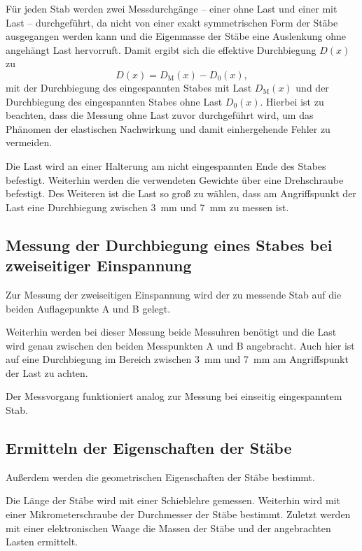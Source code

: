 Für jeden Stab werden zwei Messdurchgänge -- einer ohne Last und einer mit Last -- durchgeführt, 
da nicht von einer exakt symmetrischen Form der Stäbe ausgegangen werden kann und die Eigenmasse 
der Stäbe eine Auslenkung ohne angehängt Last hervorruft.
Damit ergibt sich die effektive Durchbiegung $D(x)$ zu
\begin{equation}
	D(x) = D_{\mathrm{M}}(x) - D_0(x) \mathrm{,}
\end{equation}
mit der Durchbiegung des eingespannten Stabes mit Last $D_{\mathrm{M}}(x)$ und der Durchbiegung
des eingespannten Stabes ohne Last $D_0(x)$.
Hierbei ist zu beachten, dass die Messung ohne Last zuvor durchgeführt wird, um das Phänomen 
der elastischen Nachwirkung \cite{V102} und damit einhergehende Fehler zu vermeiden.

Die Last wird an einer Halterung am nicht eingespannten Ende des Stabes befestigt. Weiterhin 
werden die verwendeten Gewichte über eine Drehschraube befestigt.
Des Weiteren ist die Last so groß zu wählen, dass am Angriffspunkt der Last eine Durchbiegung 
zwischen \SI{3}{\milli\meter} und \SI{7}{\milli\meter} zu messen ist.

\subsection{Messung der Durchbiegung eines Stabes bei zweiseitiger Einspannung}
Zur Messung der zweiseitigen Einspannung wird der zu messende Stab auf die beiden Auflagepunkte 
A und B gelegt.

Weiterhin werden bei dieser Messung beide Messuhren benötigt und die Last wird genau zwischen 
den beiden Messpunkten A und B angebracht. Auch hier ist auf eine Durchbiegung im Bereich 
zwischen \SI{3}{\milli\meter} und \SI{7}{\milli\meter} am Angriffspunkt der Last zu achten.

Der Messvorgang funktioniert analog zur Messung bei einseitig eingespanntem Stab.

\subsection{Ermitteln der Eigenschaften der Stäbe}
Außerdem werden die geometrischen Eigenschaften der Stäbe bestimmt.

Die Länge der Stäbe wird mit einer Schieblehre gemessen.
Weiterhin wird mit einer Mikrometerschraube der Durchmesser der Stäbe bestimmt.
Zuletzt werden mit einer elektronischen Waage die Massen der Stäbe und der angebrachten 
Lasten ermittelt.

